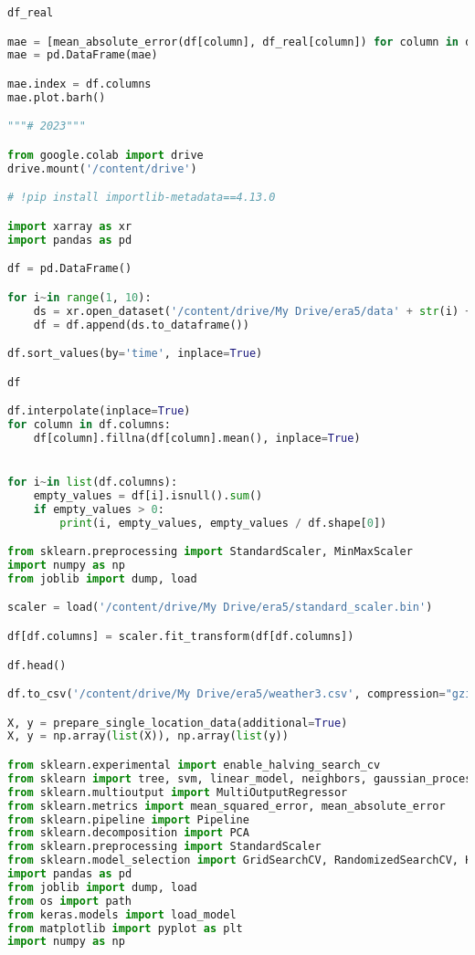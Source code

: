 \begin{lstlisting}[label=python-listing,caption={Kod źródłowy},language=python]
df_real

mae = [mean_absolute_error(df[column], df_real[column]) for column in df.columns]
mae = pd.DataFrame(mae)

mae.index = df.columns
mae.plot.barh()

"""# 2023"""

from google.colab import drive
drive.mount('/content/drive')

# !pip install importlib-metadata==4.13.0

import xarray as xr
import pandas as pd

df = pd.DataFrame()

for i~in range(1, 10):
    ds = xr.open_dataset('/content/drive/My Drive/era5/data' + str(i) + '.nc', engine='netcdf4')
    df = df.append(ds.to_dataframe())

df.sort_values(by='time', inplace=True)

df

df.interpolate(inplace=True)
for column in df.columns:
    df[column].fillna(df[column].mean(), inplace=True)


for i~in list(df.columns):
    empty_values = df[i].isnull().sum()
    if empty_values > 0:
        print(i, empty_values, empty_values / df.shape[0])

from sklearn.preprocessing import StandardScaler, MinMaxScaler
import numpy as np
from joblib import dump, load

scaler = load('/content/drive/My Drive/era5/standard_scaler.bin')

df[df.columns] = scaler.fit_transform(df[df.columns])

df.head()

df.to_csv('/content/drive/My Drive/era5/weather3.csv', compression="gzip")

X, y = prepare_single_location_data(additional=True)
X, y = np.array(list(X)), np.array(list(y))

from sklearn.experimental import enable_halving_search_cv 
from sklearn import tree, svm, linear_model, neighbors, gaussian_process, cross_decomposition, ensemble, neural_network
from sklearn.multioutput import MultiOutputRegressor
from sklearn.metrics import mean_squared_error, mean_absolute_error
from sklearn.pipeline import Pipeline
from sklearn.decomposition import PCA
from sklearn.preprocessing import StandardScaler
from sklearn.model_selection import GridSearchCV, RandomizedSearchCV, HalvingGridSearchCV
import pandas as pd
from joblib import dump, load
from os import path
from keras.models import load_model
from matplotlib import pyplot as plt
import numpy as np


\end{lstlisting}
